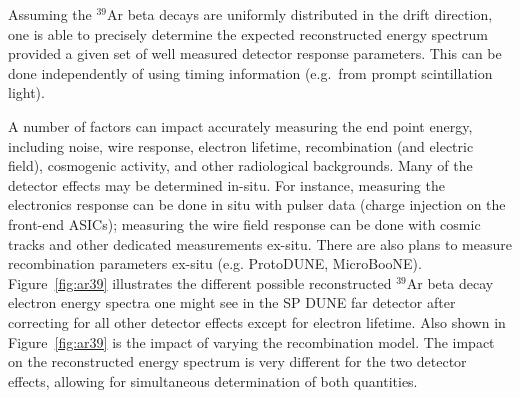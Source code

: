 Assuming the $^{39}$Ar beta decays are uniformly distributed in the drift direction, one is able to precisely determine the expected reconstructed energy spectrum 
provided a given set of well measured detector response parameters.  This can be done independently of using timing information (e.g.~from prompt scintillation light). 

A number of factors can impact accurately measuring the end point energy, including noise, wire response, electron lifetime, recombination (and electric field), cosmogenic activity, and other radiological backgrounds.
Many of the detector effects may be determined in-situ.  For instance, measuring the electronics response can be done in situ with pulser data (charge injection on the front-end ASICs); measuring the wire field response can be done with cosmic tracks and other dedicated measurements ex-situ. There are also plans to measure recombination parameters ex-situ (e.g. ProtoDUNE, MicroBooNE). Figure~\ref{fig:ar39} illustrates the different possible reconstructed $^{39}$Ar beta decay electron energy spectra one might see in the SP DUNE far detector after correcting for all other detector effects except for electron lifetime.
Also shown in Figure~\ref{fig:ar39} is the impact of varying the 
recombination model.
The impact on the reconstructed energy spectrum is very different for the two detector effects, allowing for simultaneous determination of both quantities.


